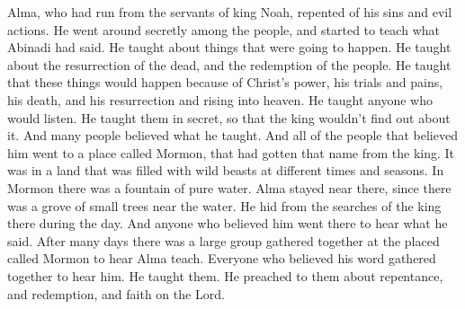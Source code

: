 Alma, who had run from the servants of king Noah, repented of his sins and evil actions. He went around secretly among the people, and started to teach what Abinadi had said.
\bverse \iffalse Yea, concerning that which was to come, and also concerning the resurrection of the dead, and the redemption of the people, which was to be brought to pass through the power, and sufferings, and death of Christ, and his resurrection and ascension into heaven. \fi
He taught about things that were going to happen. He taught about the resurrection of the dead, and the redemption of the people. He taught that these things would happen because of Christ's power, his trials and pains, his death, and his resurrection and rising into heaven.
\bverse \iffalse And as many as would hear his word he did teach. And he taught them privately, that it might not come to the knowledge of the king. And many did believe his words. \fi
He taught anyone who would listen. He taught them in secret, so that the king wouldn't find out about it. And many people believed what he taught.
\bverse \iffalse And it came to pass that as many as did believe him did go forth to a place which was called Mormon, having received its name from the king, being in the borders of the land having been infested, by times or at seasons, by wild beasts. \fi
And all of the people that believed him went to a place called Mormon, that had gotten that name from the king. It was in a land that was filled with wild beasts at different times and seasons.
\bverse \iffalse Now, there was in Mormon a fountain of pure water, and Alma resorted thither, there being near the water a thicket of small trees, where he did hide himself in the daytime from the searches of the king. \fi
In Mormon there was a fountain of pure water. Alma stayed near there, since there was a grove of small trees near the water. He hid from the searches of the king there during the day.
\bverse \iffalse And it came to pass that as many as believed him went thither to hear his words. \fi
And anyone who believed him went there to hear what he said.
\bverse \iffalse And it came to pass after many days there were a goodly number gathered together at the place of Mormon, to hear the words of Alma. Yea, all were gathered together that believed on his word, to hear him. And he did teach them, and did preach unto them repentance, and redemption, and faith on the Lord. \fi
After many days there was a large group gathered together at the placed called Mormon to hear Alma teach. Everyone who believed his word gathered together to hear him. He taught them. He preached to them about repentance, and redemption, and faith on the Lord.
